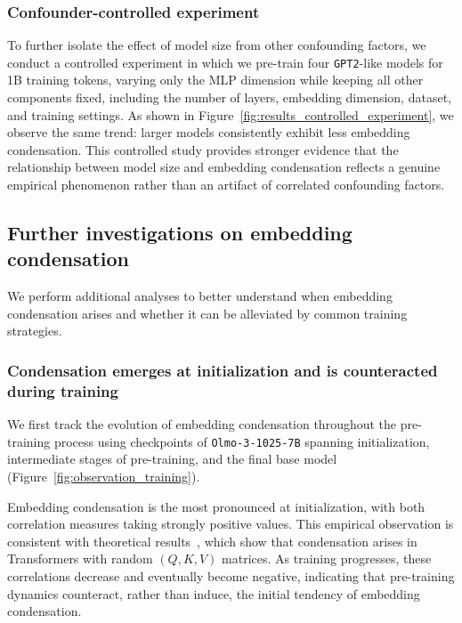 \documentclass{article}
\theoremstyle{plain}
\theoremstyle{definition}
\theoremstyle{remark}
\begin{document}
\subsubsection{Confounder-controlled experiment}
\label{sec:controlled_experiment}

To further isolate the effect of model size from other confounding factors, we conduct a controlled experiment in which we pre-train four \texttt{GPT2}-like models for 1B training tokens, varying only the MLP dimension while keeping all other components fixed, including the number of layers, embedding dimension, dataset, and training settings. As shown in Figure~\ref{fig:results_controlled_experiment}, we observe the same trend: larger models consistently exhibit less embedding condensation. This controlled study provides stronger evidence that the relationship between model size and embedding condensation reflects a genuine empirical phenomenon rather than an artifact of correlated confounding factors.


\subsection{Further investigations on embedding condensation}
\label{sec:further_investigations}

We perform additional analyses to better understand when embedding condensation arises and whether it can be alleviated by common training strategies.

\subsubsection{Condensation emerges at initialization and is counteracted during training}
\label{sec:emergence}

We first track the evolution of embedding condensation throughout the pre-training process using checkpoints of \texttt{Olmo-3-1025-7B} spanning initialization, intermediate stages of pre-training, and the final base model (Figure~\ref{fig:observation_training}).

Embedding condensation is the most pronounced at initialization, with both correlation measures taking strongly positive values. This empirical observation is consistent with theoretical results~\cite{Math_Transformer}, which show that condensation arises in Transformers with random $(Q, K, V)$ matrices. As training progresses, these correlations decrease and eventually become negative, indicating that pre-training dynamics counteract, rather than induce, the initial tendency of embedding condensation.
\end{document}
